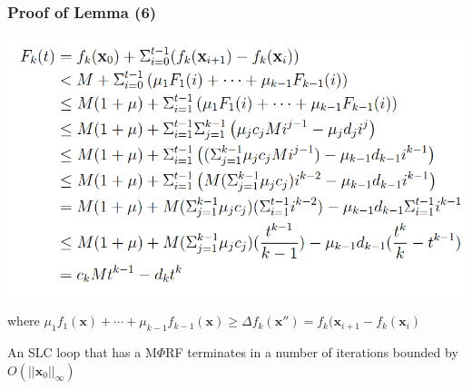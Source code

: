 \documentclass[11pt]{beamer}
\newif\ifcomm\commfalse
\begin{document}
\begin{frame}\frametitle{Proof of Lemma (6)}
\begin{center}
\includegraphics[scale= 0.33]{14.png}
\end{center}
where $ \mu_1f_1(\textbf{x}) + \cdots + \mu_{k - 1}f_{k-1}(\textbf{x}) \ge \Delta f_k(\textbf{x}'') = f_k(\textbf{x}_{i+1} - f_k(\textbf{x}_{i})$
\end{frame}
\fi
\begin{frame}
\begin{theorem}[6]
An SLC loop that has a M$\Phi$RF terminates in a number of iterations bounded by $O(||\textbf{x}_0||_\infty)$
\end{theorem}

\end{frame}
\ifcomm
\begin{frame}
\begin{theorem}[6]
An SLC loop that has a M$\Phi$RF terminates in a number of iterations bounded by $O(||\textbf{x}_0||_\infty)$
\end{theorem}

\begin{proof}
$F_k(t) \le c_kMt^{k - 1}- d_kt^k$. For $t > \max\{1, (c_k/d_k)M\}$, we have $F_k(t) < 0$.

Thus, the loop terminates by the time $\max\{1, (c_i/d_i)M, \ldots, (c_k/d_k)M\}$ where $M = \max(f_1(\textbf{x}_0), \ldots, f_k(\textbf{x}_0))$.

\end{proof}
\end{frame}
\fi
\end{document}
